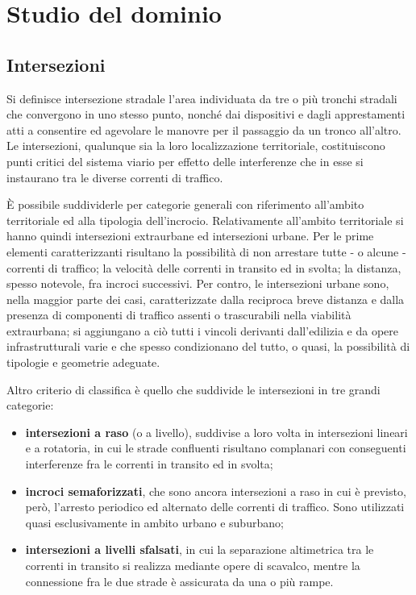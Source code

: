 \chapter{Studio del dominio}

\section{Intersezioni}
Si definisce intersezione stradale l'area individuata da tre o più tronchi stradali che convergono in uno stesso punto, nonché dai dispositivi e dagli apprestamenti atti a consentire ed agevolare le manovre per il passaggio da un tronco all'altro.
Le intersezioni, qualunque sia la loro localizzazione territoriale, costituiscono punti critici del sistema viario per effetto delle interferenze che in esse si instaurano tra le diverse correnti di traffico.

È possibile suddividerle per categorie generali con riferimento all'ambito territoriale ed alla tipologia dell'incrocio. Relativamente all'ambito territoriale si hanno quindi intersezioni extraurbane ed intersezioni urbane. Per le prime elementi caratterizzanti risultano la possibilità di non arrestare tutte - o alcune - correnti di traffico; la velocità delle correnti in transito ed in svolta; la distanza, spesso notevole, fra incroci successivi. Per contro, le intersezioni urbane sono, nella maggior parte dei casi, caratterizzate dalla reciproca breve distanza e dalla presenza di componenti di traffico assenti o trascurabili nella viabilità extraurbana; si aggiungano a ciò tutti i vincoli derivanti dall'edilizia e da opere infrastrutturali varie e che spesso condizionano del tutto, o quasi, la possibilità di tipologie e geometrie adeguate.

Altro criterio di classifica è quello che suddivide le intersezioni in tre grandi categorie:

\begin{itemize}
	\item \textbf{intersezioni a raso} (o a livello), suddivise a loro volta in intersezioni lineari e a rotatoria, in cui le strade confluenti risultano complanari con conseguenti interferenze fra le correnti in transito ed in svolta;
	
	\item \textbf{incroci semaforizzati}, che sono ancora intersezioni a raso in cui è previsto, però, l'arresto periodico ed alternato delle correnti di traffico. Sono utilizzati quasi esclusivamente in ambito urbano e suburbano;
	\item \textbf{intersezioni a livelli sfalsati}, in cui la separazione altimetrica tra le correnti in transito si realizza mediante opere di scavalco, mentre la connessione fra le due strade è assicurata da una o più rampe\cite{esposito2003fondamenti}.
\end{itemize}

